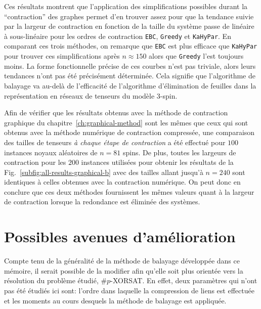 Ces résultats montrent que l'application des simplifications possibles durant la ``contraction'' des graphes permet d'en trouver assez pour que la tendance suivie par la largeur de contraction en fonction de la taille du système passe de linéaire à sous-linéaire pour les ordres de contraction \verb|EBC|, \verb|Greedy| et \verb|KaHyPar|.
En comparant ces trois méthodes, on remarque que \verb|EBC| est plus efficace que \verb|KaHyPar| pour trouver ces simplifications après $n \approx 150$ alors que \verb|Greedy| l'est toujours moins.
La forme fonctionnelle précise de ces courbes n'est pas triviale, alors leurs tendances n'ont pas été précisément déterminée.
Cela signifie que l'algorithme de balayage va au-delà de l'efficacité de l'algorithme d'élimination de feuilles dans la représentation en réseaux de tenseurs du modèle $3$-spin.

Afin de vérifier que les résultats obtenus avec la méthode de contraction graphique du chapitre~\ref{ch:graphical-method} sont les mêmes que ceux qui sont obtenus avec la méthode numérique de contraction compressée, une comparaison des tailles de tenseurs \emph{à chaque étape de contraction} a été effectué pour $100$ instances noyaux aléatoires de $n = 81$ spins.
De plus, toutes les largeurs de contraction pour les $200$ instances utilisées pour obtenir les résultats de la Fig.~\ref{subfig:all-results-graphical-b} avec des tailles allant jusqu'à $n = 240$ sont identiques à celles obtenues avec la contraction numérique.
On peut donc en conclure que ces deux méthodes fournissent les mêmes valeurs quant à la largeur de contraction lorsque la redondance est éliminée des systèmes.


\chapter{Possibles avenues d'amélioration}\label{ch:possible-ameliorations}


Compte tenu de la généralité de la méthode de balayage développée dans ce mémoire, il serait possible de la modifier afin qu'elle soit plus orientée vers la résolution du problème étudié, \#$p$-XORSAT.
En effet, deux paramètres qui n'ont pas été étudiés ici sont: l'ordre dans laquelle la compression de liens est effectuée et les moments au cours desquels la méthode de balayage est appliquée.

